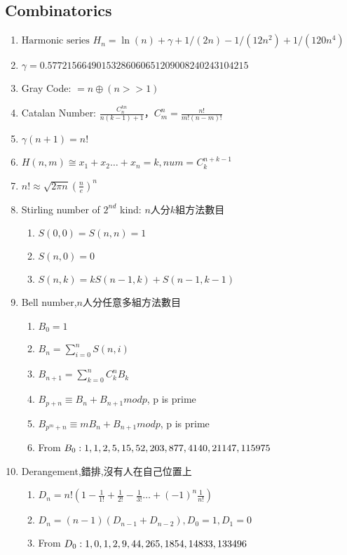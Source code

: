 \subsection{Combinatorics}
\begin{enumerate}
\itemsep = -3pt
  \item $\text{Harmonic series } H_n = \ln(n) + \gamma + 1/(2n) - 1/(12n^2) + 1/(120n^4)$
  \item $ \gamma = 0.57721566490153286060651209008240243104215$
  \item Gray Code: $=n\oplus (n>>1)$
  \item Catalan Number: $\frac{C_{n}^{kn}}{n(k-1)+1}$，$C_{m}^{n}=\frac{n!}{m!(n-m)!}$
  \item $\gamma(n + 1) = n!$
  \item $H(n,m)\cong x_1+x_2\ldots +x_n=k, num=C_{k}^{n+k-1}$
  \item $n!\approx \sqrt{2\pi n}  \left( \frac{n}{e} \right)^n$
  \item Stirling number of $2^{nd}$ kind: $n$人分$k$組方法數目
	\begin{enumerate}\itemsep = -2pt
		\item $S(0,0)=S(n,n)=1$
		\item $S(n,0)=0$
		\item $S(n,k)=kS(n-1,k)+S(n-1,k-1)$
	\end{enumerate}
  \item Bell number,$n$人分任意多組方法數目
	\begin{enumerate}\itemsep = -2pt
		\item $B_0=1$
		\item $B_n=\sum_{i=0}^nS(n,i)$
		\item $B_{n+1}=\sum_{k=0}^{n} C_k^n B_k$
		\item $B_{p+n}\equiv B{_n}+B_{n+1} mod p$, p is prime
		\item $B_{p^m+n}\equiv mB{_n}+B_{n+1} mod p$, p is prime
		\item From $B_0: 1,1,2,5,15,52,\\203,877,4140,21147,115975$
	\end{enumerate}
\item Derangement,錯排,沒有人在自己位置上
	\begin{enumerate}\itemsep = -2pt
		\item $D_n=n!(1-\frac{1}{1!}+\frac{1}{2!}-\frac{1}{3!}\ldots +(-1)^n\frac{1}{n!})$
		\item $D_n=(n-1)(D_{n-1}+D_{n-2}),D_0=1,D_1=0$
		\item From $D_0: 1,0,1,2,9,44,\\265,1854,14833,133496$

\end{enumerate}
\end{enumerate}
